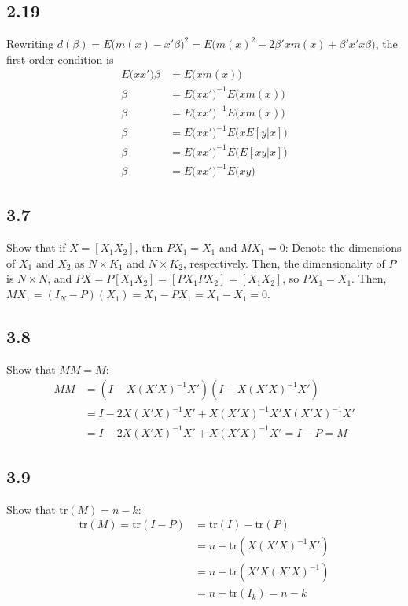 \documentclass{article}[14pt]
\begin{document}
    \subsection*{2.19}

    Rewriting $d(\beta) = E\Big( m(x) - x'\beta \Big)^2 = E \Big( m(x)^2 - 2 \beta' x m(x) + \beta' x'x \beta \Big)$, the first-order condition is
    \begin{align*}
        E \Big( x x' \Big) \beta  &= E \Big( x m(x) \Big) \\
        \beta &= E \Big( x x' \Big)^{-1} E \Big( x m(x) \Big) \\
        \beta &= E \Big( x x' \Big)^{-1} E \Big( x m(x) \Big) \\
        \beta &= E \Big( x x' \Big)^{-1} E \Big( x E[y|x] \Big) \\
        \beta &= E \Big( x x' \Big)^{-1} E \Big( E[xy|x] \Big) \\
        \beta &= E \Big( x x' \Big)^{-1} E \Big( xy \Big)
    \end{align*}

    \subsection*{3.7} 

    Show that if $X = [X_1 X_2]$, then $PX_1 = X_1$ and $MX_1 = 0$: Denote the dimensions of $X_1$ and $X_2$ as $N \times K_1$ and $N \times K_2$, respectively. Then, the dimensionality of $P$ is $N \times N$, and $P X = P [X_1 X_2] = [PX_1 PX_2] = [X_1 X_2]$, so $PX_1 = X_1$. Then, $MX_1 = (I_N - P)(X_1) = X_1 - PX_1 = X_1 - X_1 = 0$.

    \subsection*{3.8}
    Show that $MM = M$:
    \begin{align*}
        MM &= (I - X(X'X)^{-1}X')(I - X(X'X)^{-1}X') \\
        &= I - 2X(X'X)^{-1}X' + X(X'X)^{-1}X'X(X'X)^{-1}X' \\
        &= I - 2X(X'X)^{-1}X' + X(X'X)^{-1}X' = I - P = M
    \end{align*}

    \subsection*{3.9}

    Show that $\text{tr}(M) = n - k$:
    \begin{align*}
        \text{tr}(M) = \text{tr}(I - P) &= \text{tr}(I) - \text{tr}(P) \\
        &= n - \text{tr}(X(X'X)^{-1}X') \\
        &= n - \text{tr}(X'X(X'X)^{-1}) \\
        &= n - \text{tr}(I_k) = n-k
    \end{align*}
\end{document}
